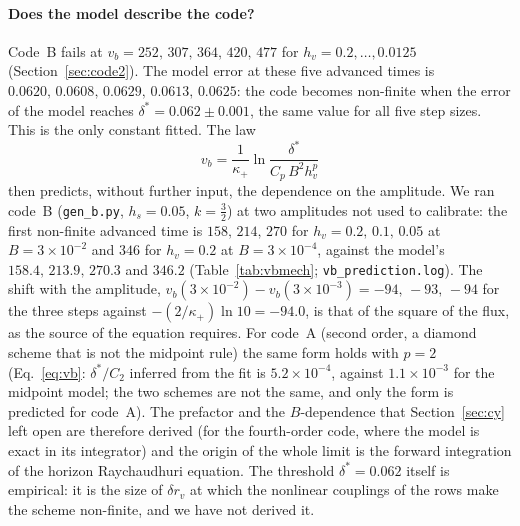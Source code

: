 \documentclass[11pt]{article}
\begin{document}
\paragraph{Does the model describe the code?} Code~B fails at $v_b=252,\,307,\,364,\,420,\,477$ for $h_v=0.2,\ldots,0.0125$ (Section~\ref{sec:code2}). The model error at these five advanced times is $0.0620,\,0.0608,\,0.0629,\,0.0613,\,0.0625$: the code becomes non-finite when the error of the model reaches $\delta^{*}=0.062\pm0.001$, the same value for all five step sizes. This is the only constant fitted. The law
\begin{equation}
v_b=\frac1{\kappa_+}\ln\frac{\delta^{*}}{C_p\,B^{2}h_v^{p}}
\label{eq:vbmech}
\end{equation}
then predicts, without further input, the dependence on the amplitude. We ran code~B (\texttt{gen\_b.py}, $h_s=0.05$, $k=\tfrac32$) at two amplitudes not used to calibrate: the first non-finite advanced time is $158,\,214,\,270$ for $h_v=0.2,\,0.1,\,0.05$ at $B=3\times10^{-2}$ and $346$ for $h_v=0.2$ at $B=3\times10^{-4}$, against the model's $158.4,\,213.9,\,270.3$ and $346.2$ (Table~\ref{tab:vbmech}; \texttt{vb\_prediction.log}). The shift with the amplitude, $v_b(3\times10^{-2})-v_b(3\times10^{-3})=-94,\,-93,\,-94$ for the three steps against $-(2/\kappa_+)\ln10=-94.0$, is that of the square of the flux, as the source of the equation requires. For code~A (second order, a diamond scheme that is not the midpoint rule) the same form holds with $p=2$ (Eq.~\eqref{eq:vb}: $\delta^{*}/C_2$ inferred from the fit is $5.2\times10^{-4}$, against $1.1\times10^{-3}$ for the midpoint model; the two schemes are not the same, and only the form is predicted for code~A). The prefactor and the $B$-dependence that Section~\ref{sec:cy} left open are therefore derived (for the fourth-order code, where the model is exact in its integrator) and the origin of the whole limit is the forward integration of the horizon Raychaudhuri equation. The threshold $\delta^{*}=0.062$ itself is empirical: it is the size of $\delta r_v$ at which the nonlinear couplings of the rows make the scheme non-finite, and we have not derived it.
\end{document}
